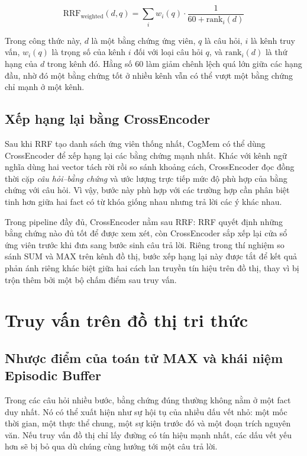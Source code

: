 \documentclass[../main.tex]{subfiles}
\begin{document}
\begin{equation}
\mathrm{RRF}_{\mathrm{weighted}}(d,q)
= \sum_i w_i(q) \cdot \frac{1}{60 + \mathrm{rank}_i(d)}
\end{equation}

Trong công thức này, $d$ là một bằng chứng ứng viên, $q$ là câu hỏi, $i$ là kênh truy vấn, $w_i(q)$ là trọng số của kênh $i$ đối với loại câu hỏi $q$, và $\mathrm{rank}_i(d)$ là thứ hạng của $d$ trong kênh đó. Hằng số 60 làm giảm chênh lệch quá lớn giữa các hạng đầu, nhờ đó một bằng chứng tốt ở nhiều kênh vẫn có thể vượt một bằng chứng chỉ mạnh ở một kênh.

\subsection{Xếp hạng lại bằng CrossEncoder}

Sau khi RRF tạo danh sách ứng viên thống nhất, CogMem có thể dùng CrossEncoder để xếp hạng lại các bằng chứng mạnh nhất. Khác với kênh ngữ nghĩa dùng hai vector tách rời rồi so sánh khoảng cách, CrossEncoder đọc đồng thời cặp \textit{câu hỏi--bằng chứng} và ước lượng trực tiếp mức độ phù hợp của bằng chứng với câu hỏi. Vì vậy, bước này phù hợp với các trường hợp cần phân biệt tinh hơn giữa hai fact có từ khóa giống nhau nhưng trả lời các ý khác nhau.

Trong pipeline đầy đủ, CrossEncoder nằm sau RRF: RRF quyết định những bằng chứng nào đủ tốt để được xem xét, còn CrossEncoder sắp xếp lại cửa sổ ứng viên trước khi đưa sang bước sinh câu trả lời. Riêng trong thí nghiệm so sánh SUM và MAX trên kênh đồ thị, bước xếp hạng lại này được tắt để kết quả phản ánh riêng khác biệt giữa hai cách lan truyền tín hiệu trên đồ thị, thay vì bị trộn thêm bởi một bộ chấm điểm sau truy vấn.

\section{Truy vấn trên đồ thị tri thức}

\subsection{Nhược điểm của toán tử MAX và khái niệm Episodic Buffer}

Trong các câu hỏi nhiều bước, bằng chứng đúng thường không nằm ở một fact duy nhất. Nó có thể xuất hiện như sự hội tụ của nhiều dấu vết nhỏ: một mốc thời gian, một thực thể chung, một sự kiện trước đó và một đoạn trích nguyên văn. Nếu truy vấn đồ thị chỉ lấy đường có tín hiệu mạnh nhất, các dấu vết yếu hơn sẽ bị bỏ qua dù chúng cùng hướng tới một câu trả lời.
\end{document}
